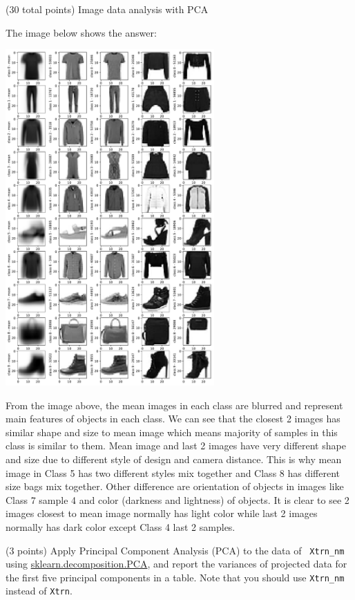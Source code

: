 \documentclass[12pt]{article}
\begin{document}
\begin{question}{(30 total points) Image data analysis with PCA}
\begin{subquestion}
  \begin{answerbox}{52em}
    The image below shows the answer:
    \begin{center}
    \includegraphics[width=0.6\textwidth]{PCA1.pdf}
    \end{center}
    From the image above, the mean images in each class are blurred and represent main features of objects in each class. We can see that the closest 2 images has similar shape and size to mean image which means majority of samples in this class is similar to them. Mean image and last 2 images have very different shape and size due to different style of design and camera distance. This is why mean image in Class 5 has two different styles mix together and Class 8 has different size bags mix together. Other difference are orientation of objects in images like Class 7 sample 4 and color (darkness and lightness) of objects. It is clear to see 2 images closest to mean image normally has light color while last 2 images normally has dark color except Class 4 last 2 samples.
  \end{answerbox}



   \end{subquestion}

   \begin{subquestion}{(3 points)
       Apply Principal Component Analysis (PCA) to the data of {\tt
         Xtrn\_nm} using
       \href{https://scikit-learn.org/0.19/modules/generated/sklearn.decomposition.PCA.html}{sklearn.decomposition.PCA},
       and report the variances of projected data for the first five principal
       components in a table. 
       Note that you should use {\tt Xtrn\_nm} instead of {\tt Xtrn}.
           } \label{Q1.pca.variance}




\end{subquestion}
\end{question}
\end{document}
